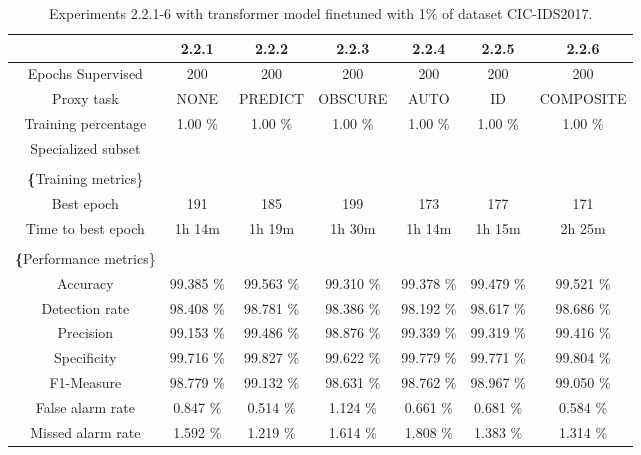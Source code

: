\begin{table}[htb]
    \centering
    \begin{tabular}{@{}ccccccc@{}}
        \toprule
         & 2.2.1 & 2.2.2 & 2.2.3 & 2.2.4 & 2.2.5 & 2.2.6 \\
        \midrule
        Epochs Supervised &  200 &  200 &  200 &  200 &  200 &  200 \\
        Proxy task &  NONE &  PREDICT &  OBSCURE &  AUTO &  ID &  COMPOSITE \\
        Training percentage &  1.00 \% &  1.00 \% &  1.00 \% &  1.00 \% &  1.00 \% &  1.00 \% \\
        Specialized subset &   &   &   &   &   &   \\
         \\
        \textbf\{Training metrics\} &  &  &  &  &  &  \\
        Best epoch &  191 &  185 &  199 &  173 &  177 &  171 \\
        Time to best epoch &  1h 14m &  1h 19m &  1h 30m &  1h 14m &  1h 15m &  2h 25m \\
         \\
        \textbf\{Performance metrics\} &  &  &  &  &  &  \\
        Accuracy &  99.385 \% &  99.563 \% &  99.310 \% &  99.378 \% &  99.479 \% &  99.521 \% \\
        Detection rate &  98.408 \% &  98.781 \% &  98.386 \% &  98.192 \% &  98.617 \% &  98.686 \% \\
        Precision &  99.153 \% &  99.486 \% &  98.876 \% &  99.339 \% &  99.319 \% &  99.416 \% \\
        Specificity &  99.716 \% &  99.827 \% &  99.622 \% &  99.779 \% &  99.771 \% &  99.804 \% \\
        F1-Measure &  98.779 \% &  99.132 \% &  98.631 \% &  98.762 \% &  98.967 \% &  99.050 \% \\
        False alarm rate &  0.847 \% &  0.514 \% &  1.124 \% &  0.661 \% &  0.681 \% &  0.584 \% \\
        Missed alarm rate &  1.592 \% &  1.219 \% &  1.614 \% &  1.808 \% &  1.383 \% &  1.314 \% \\
        \bottomrule
    \end{tabular}
    \caption{Experiments 2.2.1-6 with transformer model finetuned with 1\% of dataset CIC-IDS2017.}
    \label{table:results:lstm:stats_flows_1}
\end{table}